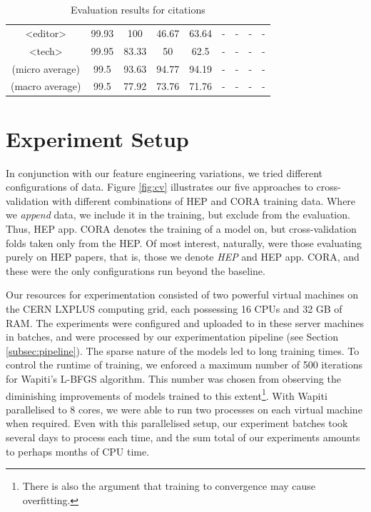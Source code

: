 \begin{table}[h]
\begin{center}
\begin{tabular}{|c|cccc|cccc|}
<editor>    &  99.93&   100     &46.67      &   63.64   & -     &   -   &   -       &   -   \\
<tech>  &   99.95   &   83.33   &   50      &   62.5    & -     &   -   &   -       &   -   \\
\hline
(micro average) & 99.5  &   93.63   &   94.77   &   94.19 & -    &   - &   -   &   -   \\
(macro average) & 99.5  &   77.92   &   73.76   &   71.76 & -    &   -  &   -   &   -   \\
\hline
\end{tabular}
\caption[Evaluation results for citations]{Evaluation results for citations}
\label{table:citationcomparison}
\end{center}
\end{table}

\section{Experiment Setup}
\label{sec:experimentsetup}

In conjunction with our feature engineering variations, we tried different configurations of data. Figure \ref{fig:cv} illustrates our five approaches to cross-validation with different combinations of HEP and CORA training data. Where we \emph{append} data, we include it in the training, but exclude from the evaluation. Thus, HEP app. CORA denotes the training of a model on, but cross-validation folds taken only from the HEP. Of most interest, naturally, were those evaluating purely on HEP papers, that is, those we denote \emph{HEP} and {HEP app. CORA}, and these were the only configurations run beyond the baseline.

Our resources for experimentation consisted of two powerful virtual machines on the CERN LXPLUS computing grid, each possessing 16 CPUs and 32 GB of RAM. The experiments were configured and uploaded to in these server machines in batches, and were processed by our experimentation pipeline (see Section \ref{subsec:pipeline}). The sparse nature of the models led to long training times. To control the runtime of training, we enforced a maximum number of 500 iterations for Wapiti's L-BFGS algorithm. This number was chosen from observing the diminishing improvements of models trained to this extent\footnote{There is also the argument that training to convergence may cause overfitting.}. With Wapiti parallelised to 8 cores, we were able to run two processes on each virtual machine when required. Even with this parallelised setup, our experiment batches took several days to process each time, and the sum total of our experiments amounts to perhaps months of CPU time.

